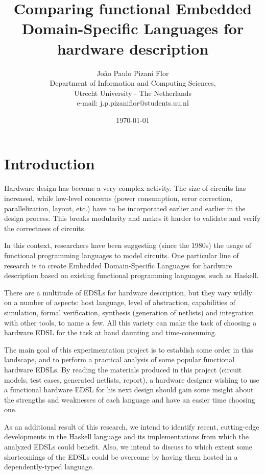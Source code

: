 \documentclass[a4paper]{article}
\title{Comparing functional Embedded Domain-Specific Languages for hardware description}
\date{\today}
\author
{
    João Paulo Pizani Flor \\
    Department of Information and Computing Sciences, \\
    Utrecht University - The Netherlands \\
    e-mail: j.p.pizaniflor@students.uu.nl
}
\begin{document}
    \maketitle

    \section{Introduction}
    \label{sec:intro}
        Hardware design has become a very complex activity. The size of circuits has increased,
        while low-level concerns (power consumption, error correction, parallelization, layout,
        etc.) have to be incorporated earlier and earlier in the design process. This breaks
        modularity and makes it harder to validate and verify the correctness of circuits.

        In this context, researchers have been suggesting (since the 1980s) the usage of functional
        programming languages to model circuits. One particular line of research is to create
        Embedded Domain-Specific Languages for hardware description based on existing functional
        programming languages, such as Haskell.

        There are a multitude of EDSLs for hardware description, but they vary wildly
        on a number of aspects: host language, level of abstraction, capabilities of simulation,
        formal verification, synthesis (generation of netlists) and integration with other tools, to
        name a few. All this variety can make the task of choosing a hardware EDSL for the task at
        hand daunting and time-consuming.

        The main goal of this experimentation project is to establish some order in this landscape,
        and to perform a practical analysis of some popular functional hardware EDSLs. By
        reading the materials produced in this project (circuit models, test cases, generated
        netlists, report), a hardware designer wishing to use a functional hardware EDSL for his
        next design should gain some insight about the strengths and weaknesses of each language and
        have an easier time choosing one.

        As an additional result of this research, we intend to identify recent, cutting-edge
        developments in the Haskell language and its implementations from which the analyzed EDSLs
        could benefit. Also, we intend to discuss to which extent some shortcomings of the EDSLs
        could be overcome by having them hosted in a dependently-typed language.
\end{document}
